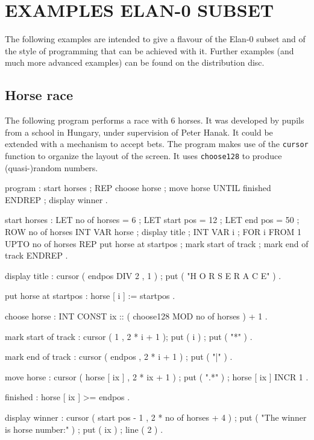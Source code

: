 \chapter{EXAMPLES ELAN-0 SUBSET}

The following examples are intended to give a flavour of the
Elan-0 subset and of the style of programming that
can be achieved with it. Further examples (and much more advanced
examples) can be found on the distribution disc.

\section{Horse race}

The following program performs a race with 6 horses. It was
developed by pupils from a school in Hungary, under supervision
of Peter Hanak. It could be extended with a mechanism to accept
bets. The program makes use of the {\tt cursor} function to organize
the layout of the screen. It uses {\tt choose128} to produce
(quasi-)random numbers.

\begin{elan}
program :
  start horses ;
  REP
    choose horse ;
    move horse
  UNTIL
    finished
  ENDREP ;
  display winner .

start horses :
  LET no of horses = 6 ;
  LET start pos = 12 ;
  LET end pos = 50 ;
  ROW no of horses INT VAR horse ;
  display title ;
  INT VAR i ;
  FOR i FROM 1 UPTO no of horses
  REP
    put horse at startpos ;
    mark start of track ;
    mark end of track
  ENDREP .

display title :
  cursor ( endpos DIV 2 , 1 ) ;
  put ( "H O R S E   R A C E" ) .

put horse at startpos :
  horse [ i ] := startpos .

choose horse :
  INT CONST ix :: ( choose128 MOD no of horses ) + 1 .

mark start of track :
  cursor ( 1 , 2 * i + 1 );
  put ( i ) ;
  put ( "*" ) .

mark end of track :
  cursor ( endpos , 2 * i + 1 ) ;
  put ( "|" ) .

move horse :
  cursor ( horse [ ix ] , 2 * ix + 1 ) ;
  put ( ".*" ) ;
  horse [ ix ] INCR 1 .

finished :
  horse [ ix ] >= endpos .

display winner :
  cursor ( start pos - 1 , 2 * no of horses + 4 ) ;
  put ( "The winner is horse number:" ) ;
  put ( ix ) ;
  line ( 2 ) .
\end{elan}

